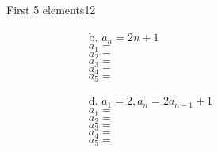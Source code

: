 \documentclass[a4paper,12pt]{book}
\begin{document}
\begin{answersheetquestion}{2}{First 5 elements}{12}
\begin{figure}[h]
\begin{subfigure}{.5\textwidth}
        \end{subfigure}%
        \begin{subfigure}{.5\textwidth}
            \centering
            
            \begin{itemize}
                \item[b.] $a_{n} = 2n+1$ \\
                        $a_{1} = $ \iftoggle{answerkey}{ \begin{answer} 3 \end{answer} }{} \\
                        $a_{2} = $ \iftoggle{answerkey}{ \begin{answer} 5 \end{answer} }{} \\
                        $a_{3} = $ \iftoggle{answerkey}{ \begin{answer} 7 \end{answer} }{} \\
                        $a_{4} = $ \iftoggle{answerkey}{ \begin{answer} 9 \end{answer} }{} \\
                        $a_{5} = $ \iftoggle{answerkey}{ \begin{answer} 11 \end{answer} }{} \\
 
                \item[d.] $a_{1} = 2, a_{n} = 2 a_{n-1} + 1$ \\
                        $a_{1} = $ \iftoggle{answerkey}{ \begin{answer} 2 \end{answer} }{} \\
                        $a_{2} = $ \iftoggle{answerkey}{ \begin{answer} 5 \end{answer} }{} \\
                        $a_{3} = $ \iftoggle{answerkey}{ \begin{answer} 11 \end{answer} }{} \\
                        $a_{4} = $ \iftoggle{answerkey}{ \begin{answer} 23 \end{answer} }{} \\
                        $a_{5} = $ \iftoggle{answerkey}{ \begin{answer} 47 \end{answer} }{} \\
            \end{itemize}
        \end{subfigure}
        \end{figure}
    \end{answersheetquestion}
\end{document}

